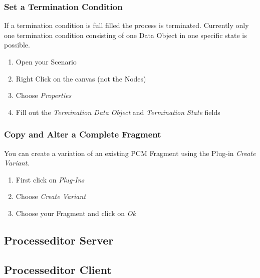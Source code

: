 \documentclass{acm_proc_article-sp}
\begin{document}
\subsubsection{Set a Termination
Condition}\label{set-a-termination-condition}

If a termination condition is full filled the process is terminated.
Currently only one termination condition consisting of one Data Object
in one specific state is possible.

\begin{enumerate}
\def\labelenumi{\arabic{enumi}.}
\itemsep1pt\parskip0pt
\item
  Open your Scenario
\item
  Right Click on the canvas (not the Nodes)
\item
  Choose \emph{Properties}
\item
  Fill out the \emph{Termination Data Object} and \emph{Termination
  State} fields
\end{enumerate}

\subsubsection{Copy and Alter a Complete
Fragment}\label{copy-and-alter-a-complete-fragment}

You can create a variation of an existing PCM Fragment using the Plug-in
\emph{Create Variant}.

\begin{enumerate}
\def\labelenumi{\arabic{enumi}.}
\itemsep1pt\parskip0pt
\item
  First click on \emph{Plug-Ins}
\item
  Choose \emph{Create Variant}
\item
  Choose your Fragment and click on \emph{Ok}
\end{enumerate}


%
%
\subsection{Processeditor Server}


%
%
\subsection{Processeditor Client}


%
%

%
 

%
%
\end{document}
